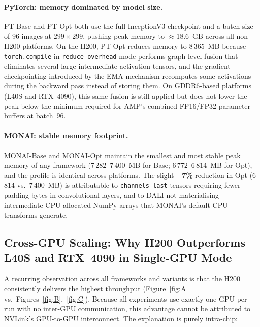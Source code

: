 \paragraph{PyTorch: memory dominated by model size.}
PT-Base and PT-Opt both use the full InceptionV3 checkpoint and a
batch size of 96 images at $299{\times}299$, pushing peak memory to
$\approx$18.6~GB across all non-H200 platforms.  On the H200, PT-Opt
reduces memory to 8\,365~MB because \texttt{torch.compile} in
\texttt{reduce-overhead} mode performs graph-level fusion that
eliminates several large intermediate activation tensors, and the
gradient checkpointing introduced by the EMA mechanism recomputes some
activations during the backward pass instead of storing them.  On
GDDR6-based platforms (L40S and RTX~4090), this same fusion is still
applied but does not lower the peak below the minimum required for
AMP's combined FP16/FP32 parameter buffers at batch~96.

\paragraph{MONAI: stable memory footprint.}
MONAI-Base and MONAI-Opt maintain the smallest and most stable peak
memory of any framework ($7\,282$--$7\,400$~MB for Base;
$6\,772$--$6\,814$~MB for Opt), and the profile is identical across
platforms.  The slight \textbf{$-$7\%} reduction in Opt (6\,814 vs.\
7\,400~MB) is attributable to \texttt{channels\_last} tensors requiring
fewer padding bytes in convolutional layers, and to DALI not
materialising intermediate CPU-allocated NumPy arrays that MONAI's
default CPU transforms generate.

\subsection{Cross-GPU Scaling: Why H200 Outperforms L40S and RTX~4090 in Single-GPU Mode}
\label{subsec:cross_gpu}

A recurring observation across all frameworks and variants is that the
H200 consistently delivers the highest throughput (Figure~\ref{fig:A}
vs.\ Figures~\ref{fig:B},~\ref{fig:C}).  Because all experiments use
exactly one GPU per run with no inter-GPU communication, this advantage
cannot be attributed to NVLink's GPU-to-GPU interconnect.  The
explanation is purely intra-chip:

